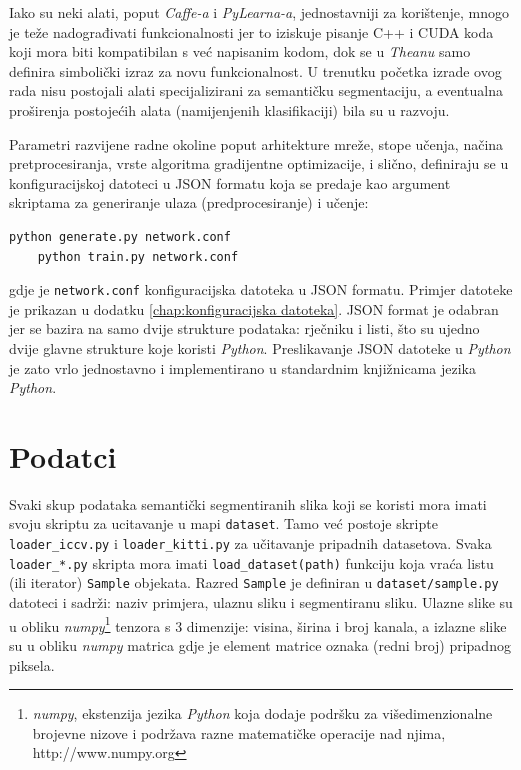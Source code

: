 \documentclass[times, utf8, diplomski, numeric]{fer}
\begin{document}
Iako su neki alati, poput \textit{Caffe-a} i \textit{PyLearna-a}, jednostavniji za korištenje, mnogo je teže nadograđivati funkcionalnosti jer to iziskuje pisanje C++ i CUDA koda koji mora biti kompatibilan s već napisanim kodom, dok se u \textit{Theanu} samo definira simbolički izraz za novu funkcionalnost. U trenutku početka izrade ovog rada nisu postojali alati specijalizirani za semantičku segmentaciju, a eventualna proširenja postojećih alata (namijenjenih klasifikaciji) bila su u razvoju.

Parametri razvijene radne okoline poput arhitekture mreže, stope učenja, načina pretprocesiranja, vrste algoritma gradijentne optimizacije, i slično, definiraju se u konfiguracijskoj datoteci u JSON formatu koja se predaje kao argument skriptama za generiranje ulaza (predprocesiranje) i učenje:
\begin{lstlisting}[language=bash]
    python generate.py network.conf
    python train.py network.conf
\end{lstlisting}
gdje je \texttt{network.conf} konfiguracijska datoteka u JSON formatu. Primjer datoteke je prikazan u dodatku \ref{chap:konfiguracijska datoteka}. JSON format je odabran jer se bazira na samo dvije strukture podataka: rječniku i listi, što su ujedno dvije glavne strukture koje koristi \textit{Python}. Preslikavanje JSON datoteke u \textit{Python} je zato vrlo jednostavno i implementirano u standardnim knjižnicama jezika \textit{Python}.

\section{Podatci}
Svaki skup podataka semantički segmentiranih slika koji se koristi mora imati svoju skriptu za ucitavanje u mapi \texttt{dataset}. Tamo već postoje skripte \texttt{loader\_iccv.py} i \texttt{loader\_kitti.py} za učitavanje pripadnih datasetova. Svaka \texttt{loader\_*.py} skripta mora imati \texttt{load\_dataset(path)} funkciju koja vraća listu (ili iterator) \texttt{Sample} objekata. Razred \texttt{Sample} je definiran u \texttt{dataset/sample.py} datoteci i sadrži: naziv primjera, ulaznu sliku i segmentiranu sliku. Ulazne slike su u obliku \emph{numpy}\footnote{\textit{numpy}, ekstenzija jezika \textit{Python} koja dodaje podršku za višedimenzionalne brojevne nizove i podržava razne matematičke operacije nad njima, http://www.numpy.org} tenzora s 3 dimenzije: visina, širina i broj kanala, a izlazne slike su u obliku \emph{numpy} matrica gdje je element matrice oznaka (redni broj) pripadnog piksela.
\end{document}
